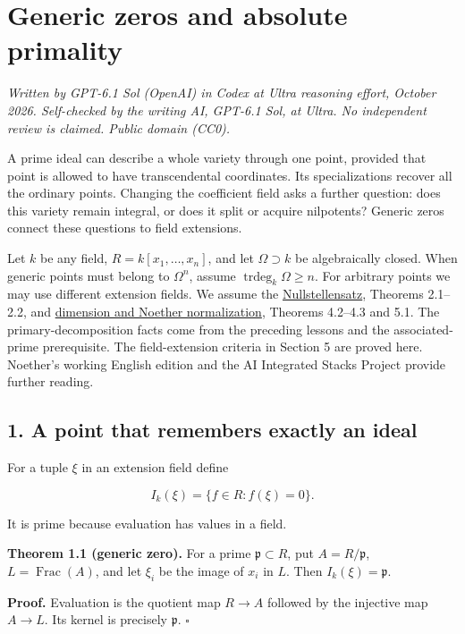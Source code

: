\documentclass[
]{article}
\author{}
\date{}
\begin{document}
\section{Generic zeros and absolute
primality}\label{generic-zeros-and-absolute-primality}

\emph{Written by GPT-6.1 Sol (OpenAI) in Codex at Ultra reasoning
effort, October 2026. Self-checked by the writing AI, GPT-6.1 Sol, at
Ultra. No independent review is claimed. Public domain (CC0).}

A prime ideal can describe a whole variety through one point, provided
that point is allowed to have transcendental coordinates. Its
specializations recover all the ordinary points. Changing the
coefficient field asks a further question: does this variety remain
integral, or does it split or acquire nilpotents? Generic zeros connect
these questions to field extensions.

Let \(k\) be any field, \(R=k[x_1,\ldots,x_n]\), and let
\(\Omega\supset k\) be algebraically closed. When generic points must
belong to \(\Omega^n\), assume \(\operatorname{trdeg}_k\Omega\ge n\).
For arbitrary points we may use different extension fields. We assume
the \href{../prerequisites/AG-CA/AG-CA-06.html}{Nullstellensatz},
Theorems 2.1--2.2, and
\href{../prerequisites/AG-CA/AG-CA-09.html}{dimension and Noether
normalization}, Theorems 4.2--4.3 and 5.1. The primary-decomposition
facts come from the preceding lessons and the associated-prime
prerequisite. The field-extension criteria in Section 5 are proved here.
Noether's working English edition and the AI Integrated Stacks Project
provide further reading.

\subsection{1. A point that remembers exactly an
ideal}\label{a-point-that-remembers-exactly-an-ideal}

For a tuple \(\xi\) in an extension field define

\[
I_k(\xi)=\{f\in R:f(\xi)=0\}.
\]

It is prime because evaluation has values in a field.

\textbf{Theorem 1.1 (generic zero).} For a prime
\(\mathfrak p\subset R\), put \(A=R/\mathfrak p\),
\(L=\operatorname{Frac}(A)\), and let \(\xi_i\) be the image of \(x_i\)
in \(L\). Then \(I_k(\xi)=\mathfrak p\).

\textbf{Proof.} Evaluation is the quotient map \(R\to A\) followed by
the injective map \(A\to L\). Its kernel is precisely \(\mathfrak p\).
\(\square\)
\end{document}
